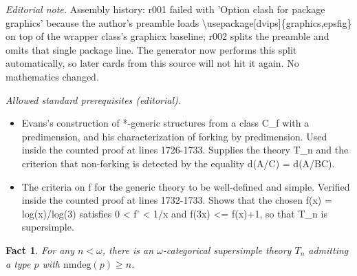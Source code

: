 \documentclass[10pt,a4paper]{amsart}
\newtheorem{fact}[theorem]{Fact}
\theoremstyle{definition}
\theoremstyle{remark}
\numberwithin{equation}{section}
\begin{document}
\noindent\textit{Editorial note.} Assembly history: r001 failed with 'Option clash for package graphics' because the author's preamble loads \textbackslash{}usepackage[dvips]\{graphics,epsfig\} on top of the wrapper class's graphicx baseline; r002 splits the preamble and omits that single package line. The generator now performs this split automatically, so later cards from this source will not hit it again. No mathematics changed.\par\medskip
\noindent\textit{Allowed standard prerequisites (editorial).}\begin{itemize}
\item Evans's construction of *-generic structures from a class C\_f with a predimension, and his characterization of forking by predimension. Used inside the counted proof at lines 1726-1733. Supplies the theory T\_n and the criterion that non-forking is detected by the equality d(A/C) = d(A/BC).
\item The criteria on f for the generic theory to be well-defined and simple. Verified inside the counted proof at lines 1732-1733. Shows that the chosen f(x) = log(x)/log(3) satisfies 0 < f' < 1/x and f(3x) <= f(x)+1, so that T\_n is supersimple.
\end{itemize}\medskip
\begin{fact}
    For any $n < \omega$, there is an $\omega$-categorical supersimple theory $T_n$
    admitting a type $p$ with $\mathrm{nmdeg}(p) \geq n$.
\label{simpnm}
\end{fact}
\end{document}
